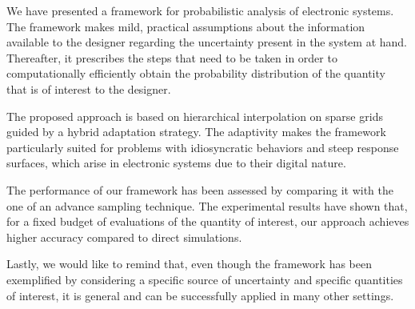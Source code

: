 We have presented a framework for probabilistic analysis of electronic systems.
The framework makes mild, practical assumptions about the information available
to the designer regarding the uncertainty present in the system at hand.
Thereafter, it prescribes the steps that need to be taken in order to
computationally efficiently obtain the probability distribution of the quantity
that is of interest to the designer.

The proposed approach is based on hierarchical interpolation on sparse grids
guided by a hybrid adaptation strategy. The adaptivity makes the framework
particularly suited for problems with idiosyncratic behaviors and steep response
surfaces, which arise in electronic systems due to their digital nature.

The performance of our framework has been assessed by comparing it with the one
of an advance sampling technique. The experimental results have shown that, for
a fixed budget of evaluations of the quantity of interest, our approach achieves
higher accuracy compared to direct simulations.

Lastly, we would like to remind that, even though the framework has been
exemplified by considering a specific source of uncertainty and specific
quantities of interest, it is general and can be successfully applied in many
other settings.
